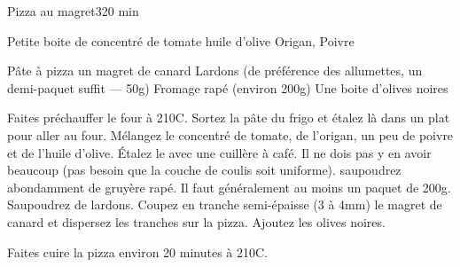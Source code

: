 \begin{recette}{Pizza au magret}{3}{}{20 min}

\begin{ingredients}
\ingredient Petite boite de concentré de tomate
\ingredient huile d'olive
\ingredient Origan, Poivre

\ingredient Pâte à pizza
\ingredient un magret de canard
\ingredient Lardons (de préférence des allumettes, un demi-paquet suffit --- 50g)
\ingredient Fromage rapé (environ 200g)
\ingredient Une boite d'olives noires
\end{ingredients}

\begin{preparation}
\etape Faites préchauffer le four à 210\degres C.
\etape Sortez la pâte du frigo et étalez là dans un plat pour aller au four.
\etape Mélangez le concentré de tomate, de l'origan, un peu de poivre et de l'huile d'olive.
\etape Étalez le avec une cuillère à café. Il ne dois pas y en avoir beaucoup (pas besoin que la couche de coulis soit uniforme).
\etape saupoudrez abondamment de gruyère rapé. Il faut généralement au moins un paquet de 200g. Saupoudrez de lardons.
\etape Coupez en tranche semi-épaisse (3 à 4mm) le magret de canard et dispersez les tranches sur la pizza.
\etape Ajoutez les olives noires.
\end{preparation}

\begin{cuisson}
Faites cuire la pizza environ 20 minutes à 210\degres C.
\end{cuisson}
\end{recette}

